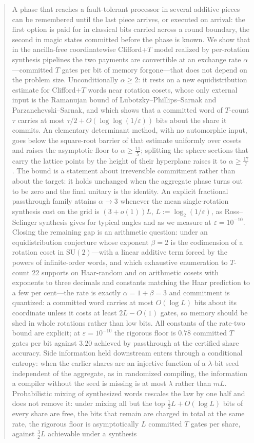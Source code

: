\documentclass[aps,prx,twocolumn,superscriptaddress,nofootinbib,longbibliography]{revtex4-2}
\theoremstyle{plain}
\theoremstyle{definition}
\theoremstyle{remark}
\newcommand{\SU}{\mathrm{SU}(2)}
\begin{document}
\begin{abstract}
A phase that reaches a fault-tolerant processor in several additive pieces can be remembered until the last piece arrives, or executed on arrival: the first option is paid for in classical bits carried across a round boundary, the second in magic states committed before the phase is known. We show that in the ancilla-free coordinatewise Clifford+$T$ model realized by per-rotation synthesis pipelines the two payments are convertible at an exchange rate $\alpha$---committed $T$ gates per bit of memory forgone---that does not depend on the problem size. Unconditionally $\alpha\ge2$: it rests on a new equidistribution estimate for Clifford+$T$ words near rotation cosets, whose only external input is the Ramanujan bound of Lubotzky--Phillips--Sarnak and Parzanchevski--Sarnak, and which shows that a committed word of $T$-count $\tau$ carries at most $\tau/2+O(\log\log(1/\varepsilon))$ bits about the share it commits. An elementary determinant method, with no automorphic input, goes below the square-root barrier of that estimate uniformly over cosets and raises the asymptotic floor to $\alpha\ge\tfrac{11}5$; splitting the sphere sections that carry the lattice points by the height of their hyperplane raises it to $\alpha\ge\tfrac{17}7$. The bound is a statement about irreversible commitment rather than about the target: it holds unchanged when the aggregate phase turns out to be zero and the final unitary is the identity. An explicit fractional passthrough family attains $\alpha\to3$ whenever the mean single-rotation synthesis cost on the grid is $(3+o(1))L$, $L:=\log_2(1/\varepsilon)$, as Ross--Selinger synthesis gives for typical angles and as we measure at $\varepsilon=10^{-10}$. Closing the remaining gap is an arithmetic question: under an equidistribution conjecture whose exponent $\beta=2$ is the codimension of a rotation coset in $\SU$---with a linear additive term forced by the powers of infinite-order words, and which exhaustive enumeration to $T$-count $22$ supports on Haar-random and on arithmetic cosets with exponents to three decimals and constants matching the Haar prediction to a few per cent---the rate is exactly $\alpha=1+\beta=3$ and commitment is quantized: a committed word carries at most $O(\log L)$ bits about its coordinate unless it costs at least $2L-O(1)$ gates, so memory should be shed in whole rotations rather than low bits. All constants of the rate-two bound are explicit; at $\varepsilon=10^{-10}$ the rigorous floor is $0.78$ committed $T$ gates per bit against $3.20$ achieved by passthrough at the certified share accuracy. Side information held downstream enters through a conditional entropy: when the earlier shares are an injective function of a $\lambda$-bit seed independent of the aggregate, as in randomized compiling, the information a compiler without the seed is missing is at most $\lambda$ rather than $mL$. Probabilistic mixing of synthesized words rescales the law by one half and does not remove it: under mixing all but the top $\tfrac12L+O(\log L)$ bits of every share are free, the bits that remain are charged in total at the same rate, the rigorous floor is asymptotically $L$ committed $T$ gates per share, against $\tfrac32L$ achievable under a synthesis 
\end{abstract}
\end{document}
